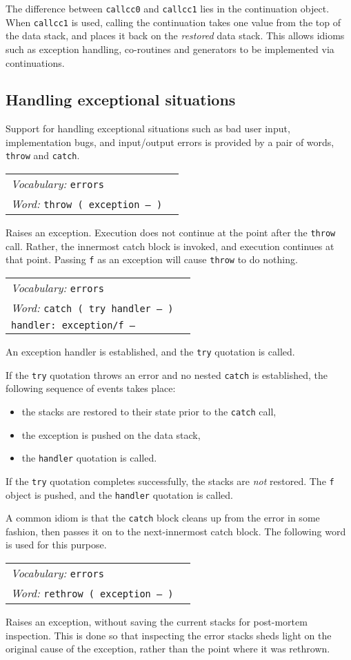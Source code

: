 \documentclass{book}
\newcommand{\vocabulary}[1]{\emph{Vocabulary:} \texttt{#1}&\\}
\newcommand{\ordinaryword}[2]{\index{\texttt{#1}}\emph{Word:} \texttt{#2}&\\}
\newcommand{\wordtable}[1]{


\begin{tabularx}{12cm}{lX}
\hline
#1
\hline
\end{tabularx}

}
\begin{document}
The difference between \texttt{callcc0} and \texttt{callcc1} lies in the continuation object. When \texttt{callcc1} is used, calling the continuation takes one value from the top of the data stack, and places it back on the \emph{restored} data stack. This allows idioms such as exception handling, co-routines and generators to be implemented via continuations.

\subsection{Handling exceptional situations}\label{exceptions}

Support for handling exceptional situations such as bad user input, implementation bugs, and input/output errors is provided by a pair of words, \texttt{throw} and \texttt{catch}.

\wordtable{
\vocabulary{errors}
\ordinaryword{throw}{throw ( exception -- )}
}
Raises an exception. Execution does not continue at the point after the \texttt{throw} call. Rather, the innermost catch block is invoked, and execution continues at that point. Passing \texttt{f} as an exception will cause \texttt{throw} to do nothing.
\wordtable{
\vocabulary{errors}
\ordinaryword{catch}{catch ( try handler -- )}
\texttt{handler:~exception/f -- }\\
}
An exception handler is established, and the \texttt{try} quotation is called.

If the \texttt{try} quotation throws an error and no nested \texttt{catch} is established, the following sequence of events takes place:
\begin{itemize}
\item the stacks are restored to their state prior to the \texttt{catch} call,
\item the exception is pushed on the data stack,
\item the \texttt{handler} quotation is called.
\end{itemize}
If the \texttt{try} quotation completes successfully, the stacks are \emph{not} restored. The \texttt{f} object is pushed, and the \texttt{handler} quotation is called.

A common idiom is that the \texttt{catch} block cleans up from the error in some fashion, then passes it on to the next-innermost catch block. The following word is used for this purpose.
\wordtable{
\vocabulary{errors}
\ordinaryword{rethrow}{rethrow ( exception -- )}
}
Raises an exception, without saving the current stacks for post-mortem inspection. This is done so that inspecting the error stacks sheds light on the original cause of the exception, rather than the point where it was rethrown.
\end{document}
